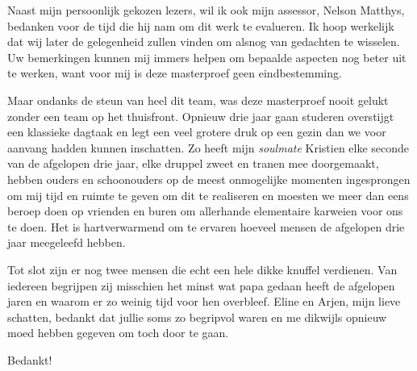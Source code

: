 \begin{preface}
Naast mijn persoonlijk gekozen lezers, wil ik ook mijn assessor, Nelson
Matthys, bedanken voor de tijd die hij nam om dit werk te evalueren. Ik hoop
werkelijk dat wij later de gelegenheid zullen vinden om alsnog van gedachten te
wisselen. Uw bemerkingen kunnen mij immers helpen om bepaalde aspecten nog
beter uit te werken, want voor mij is deze masterproef geen eindbestemming.

Maar ondanks de steun van heel dit team, was deze masterproef nooit gelukt
zonder een team op het thuisfront. Opnieuw drie jaar gaan studeren overstijgt
een klassieke dagtaak en legt een veel grotere druk op een gezin dan we voor
aanvang hadden kunnen inschatten. Zo heeft mijn \emph{soulmate} Kristien elke
seconde van de afgelopen drie jaar, elke druppel zweet en tranen mee
doorgemaakt, hebben ouders en schoonouders op de meest onmogelijke momenten
ingesprongen om mij tijd en ruimte te geven om dit te realiseren en moesten we
meer dan eens beroep doen op vrienden en buren om allerhande elementaire
karweien voor ons te doen. Het is hartverwarmend om te ervaren hoeveel mensen
de afgelopen drie jaar meegeleefd hebben.

Tot slot zijn er nog twee mensen die echt een hele dikke knuffel verdienen. Van
iedereen begrijpen zij misschien het minst wat papa gedaan heeft de afgelopen
jaren en waarom er zo weinig tijd voor hen overbleef. Eline en Arjen, mijn
lieve schatten, bedankt dat jullie soms zo begripvol waren en me dikwijls
opnieuw moed hebben gegeven om toch door te gaan.

\bigskip

Bedankt!

\end{preface}
